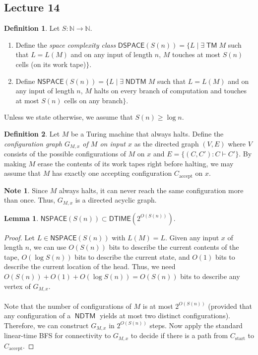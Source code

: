 \documentclass[10pt,letterpaper,cm]{nupset}
\theoremstyle{definition}
\newtheorem*{definition}{Definition}
\newtheorem{note}{Note}
\newtheorem{lemma}{Lemma}
\newcommand{\N}{\mathbb N}
\newcommand{\1}{\mathbf{1}}
\newcommand{\0}{\vec 0}
\DeclareMathOperator{\TM}{\mathsf{TM}}
\DeclareMathOperator{\NDTM}{\mathsf{NDTM}}
\begin{document}
\subsection{Lecture 14}

\begin{definition} Let $S: \N \to \N$.
\begin{enumerate}
\item Define the \textit{space complexity class} $\mathsf{DSPACE}(S(n)) = \{L \mid \exists \TM M$ such that $L = L(M)$ and on any input of length $n$, $M$ touches at most $S(n)$ cells (on its work tape)$\}$.
\item Define $\mathsf{NSPACE}(S(n)) = \{L \mid \exists \NDTM M$ such that $L = L(M)$ and on any input of length $n$, $M$ halts on every branch of computation and touches at most $S(n)$ cells on any branch$\}$.
\end{enumerate}
Unless we state otherwise, we assume that $S(n) \geq \log{n}$.
\end{definition}

\begin{definition}
Let $M$ be a Turing machine that always halts. Define the \textit{configuration graph $G_{M,x}$ of $M$ on input $x$} as the directed graph $(V, E)$ where $V$ consists of the possible configurations of $M$ on $x$ and $E = \{(C,C') : C \vdash C'\}$. By making $M$ erase the contents of its work tapes right before halting, we may assume that $M$ has exactly one accepting configuration $C_{\text{accept}}$ on $x$.
\end{definition}

\begin{note}
Since $M$ always halts, it can never reach the same configuration more than once. Thus, $G_{M,x}$ is a directed acyclic graph.  
\end{note}

\begin{lemma}
$\mathsf{NSPACE}(S(n)) \subset \mathsf{DTIME}(2^{O(S(n))})$.
\end{lemma}
\begin{proof}
Let $L \in \mathsf{NSPACE}(S(n)) $ with $L(M) = L$.  Given any input $x$ of length $n$, we can use $O(S(n))$ bits to describe the current contents of the tape, $O(\log{S(n)})$ bits to describe the current state, and $O(1)$ bits to describe the current location of the head. Thus, we need $O(S(n)) + O(1) + O(\log{S(n)})= O(S(n))$ bits to describe any vertex of $G_{M,x}$. 
\\ \\
Note that the number of configurations of $M$ is at most $2^{O(S(n))}$ (provided that any configuration of a $\NDTM$ yields at most two distinct configurations).  Therefore, we can construct $G_{M,x}$ in $2^{O(S(n))}$ steps. Now apply the standard linear-time BFS for connectivity to $G_{M,x}$ to decide if there is a path from $C_{\text{start}}$ to $C_{\text{accept}}$. 
\end{proof}
\end{document}
